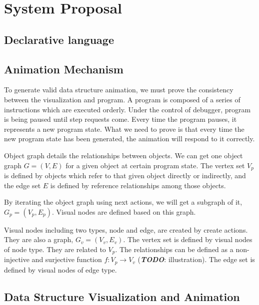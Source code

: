 \chapter {System Proposal}

\section {Declarative language}

\section {Animation Mechanism}
To generate valid data structure animation, we must prove the consistency between the visualization and program. A program is composed of a series of instructions which are executed orderly. Under the control of debugger, program is being paused until step requests come. Every time the program pauses, it represents a new program state. What we need to prove is that every time the new program state has been generated, the animation will respond to it correctly.

Object graph details the relationships between objects. We can get one object graph \(G = (V, E)\) for a given object at certain program state. The vertex set $V_p$ is defined by objects which refer to that given object directly or indirectly, and the edge set $E$ is defined by reference relationships among those objects.

By iterating the object graph using next actions, we will get a subgraph of it, \(G_p = (V_p, E_p)\). Visual nodes are defined based on this graph. 

Visual nodes including two types, node and edge, are created by create actions. They are also a graph, \(G_v = (V_v, E_v)\). The vertex set is defined by visual nodes of node type. They are related to $V_p$. The relationships can be defined as a non-injective and surjective function \(f:V_p\rightarrow V_v\) (\textbf{\textit{TODO}}: illustration). The edge set is defined by visual nodes of edge type.

\section {Data Structure Visualization and Animation}

